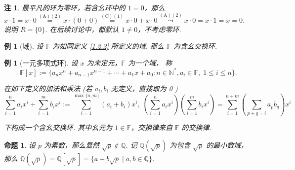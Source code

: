 \documentclass[10pt,openany]{article}
\theoremstyle{thmstyle} %
\theoremstyle{defstyle} %
\theoremstyle{prostyle} %
\newtheorem{proposition}[theorem]{命题}
\theoremstyle{exastyle}
\newtheorem{example}[theorem]{例}
\theoremstyle{remstyle}
\newtheorem{remark}[theorem]{注}
\newcommand{\F}{\mathbb{F}}
\begin{document}
\begin{remark}
	最平凡的环为零环，若含幺环中的 \( 1=0 \)，那么 \( x \cdot 1= x \cdot 0 \overset{(\text{A})(2)}{=} x \cdot (0+0) \overset{(\text{C})(1)}{=} x \cdot 0+ x \cdot 0 \overset{(\text{A})(2)}{\leadsto} x \cdot 0=x \cdot 1=x=0 \). 说明 \( R=\{0\} \). 在后续讨论中，都默认 \( 1 \neq 0 \)，不考虑零环.
\end{remark}

\begin{example}[域]
	设 \( \F \) 为如同定义 \ref{1.2.2} 所定义的域. 那么 \( \F \) 为含幺交换环. 
\end{example}

\begin{example}[一元多项式环]
	设 \( x \) 为未定元，\( \F \) 为一个域， 称
	\[ \F[x]:=\{ a_nx^n+a_{n-1}x^{n-1}+\cdots+a_1x+a_0 : n \in \mathbb{N}^*, a_i \in \F, \; 1 \leq i \leq n \}. \]
	
	在如下定义的加法和乘法 (若 \( a_i, b_i \) 无定义，直接取为 0 )
	\[ \sum_{i=1}^{n} a_ix^i + \sum_{i=1}^{m} b_ix^i:= \sum_{i=1}^{\max\{n,m\}} (a_i+b_i)x^i, \; \left( \sum_{i=1}^{n} a_ix^i \right)\left( \sum_{i=1}^{m} b_ix^i \right)= \sum_{i=1}^{n+m} \left( \sum_{p+q=i}^{} a_pb_q \right) x^i \]
	
	下构成一个含幺交换环. 其中幺元为 \( 1 \in \F \)，交换律来自 \( \F \) 的交换律. 
\end{example}

\begin{proposition}	\label{1.2.12}
	设 \( p \) 为素数，那么显然 \( \sqrt{p} \notin \mathbb{Q} \). 记 \( \mathbb{Q}(\sqrt{p}) \) 为包含 \( \sqrt{p} \) 的最小数域，那么 \( \mathbb{Q}(\sqrt{p})=\mathbb{Q}[\sqrt{p}]=\{ a+b\sqrt{p} \mid a,b \in \mathbb{Q} \} \).

\end{proposition}
\end{document}
